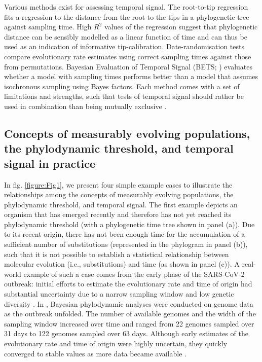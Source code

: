 \documentclass[11pt]{article}
\begin{document}
Various methods exist for assessing temporal signal. The root-to-tip regression \citep{buonagurio1986evolution, gojobori1990molecular, drummond2003inference} fits a regression to the distance from the root to the tips in a phylogenetic tree against sampling time. High $R^2$ values of the regression suggest that phylogenetic distance can be sensibly modelled as a linear function of time and can thus be used as an indication of informative tip-calibration. Date-randomisation tests \citep{ramsden2009hantavirus, duchene2015performance, duchene2018inferring, trovao2015host} compare evolutionary rate estimates using correct sampling times against those from permutations. Bayesian Evaluation of Temporal Signal (BETS; \cite{duchene2020bayesian}) evaluates whether a model with sampling times performs better than a model that assumes isochronous sampling using Bayes factors. Each method comes with a set of limitations and strengths, such that tests of temporal signal should rather be used in combination than being mutually exclusive \citep{rieux2016inferences, duchene2020bayesian}.

\subsection{Concepts of measurably evolving populations, the phylodynamic threshold, and temporal signal in practice}
In fig. \ref{figure:Fig1}, we present four simple example cases to illustrate the relationships among the concepts of measurably evolving populations, the phylodynamic threshold, and temporal signal. The first example depicts an organism that has emerged recently and therefore has not yet reached its phylodynamic threshold (with a phylogenetic time tree shown in panel (a)). Due to its recent origin, there has not been enough time for the accumulation of a sufficient number of substitutions (represented in the phylogram in panel (b)), such that it is not possible to establish a statistical relationship between molecular evolution (i.e., substitutions) and time (as shown in panel (c)). A real-world example of such a case comes from the early phase of the SARS-CoV-2 outbreak: initial efforts to estimate the evolutionary rate and time of origin had substantial uncertainty due to a narrow sampling window and low genetic diversity \citep{boni2020evolutionary}. In \cite{duchene2020temporal}, Bayesian phylodynamic analyses were conducted on genome data as the outbreak unfolded. The number of available genomes and the width of the sampling window increased over time and ranged from 22 genomes sampled over 31 days to 122 genomes sampled over 63 days. Although early estimates of the evolutionary rate and time of origin were highly uncertain, they quickly converged to stable values as more data became available \citep{ghafari2022purifying}. 
   
\end{document}
